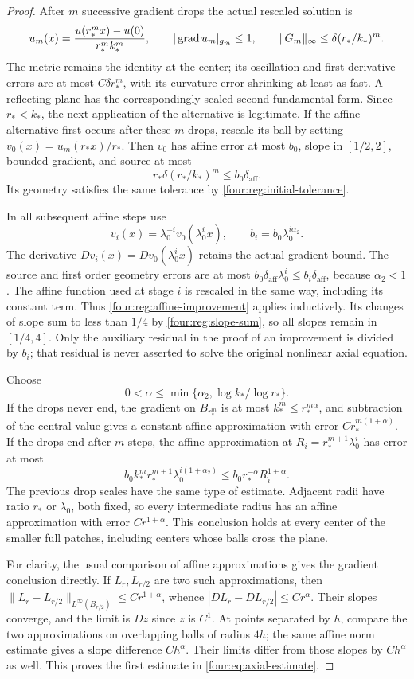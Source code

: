 \begin{proof}
After $m$ successive gradient drops the actual rescaled solution is
\[
 u_m(x)=\frac{u(r_*^m x)-u(0)}{r_*^m k_*^m},\qquad
 |\operatorname{grad} u_m|_{g_m}\le1,\qquad
 \|G_m\|_\infty\le\delta(r_*/k_*)^m.
\]
The metric remains the identity at the center; its oscillation and
first derivative errors are at most $C\delta r_*^m$, with its
curvature error shrinking at least as fast.  A reflecting plane
has the correspondingly scaled second fundamental form.  Since
$r_*<k_*$, the next application of the alternative is legitimate.
If the affine alternative first occurs after these $m$ drops,
rescale its ball by setting $v_0(x)=u_m(r_*x)/r_*$.
Then $v_0$ has affine error at most $b_0$, slope in $[1/2,2]$,
bounded gradient, and source at most
\[
 r_*\delta(r_*/k_*)^m\le b_0\delta_{\mathrm{aff}}.
\]
Its geometry satisfies the same tolerance by
\eqref{four:reg:initial-tolerance}.

In all subsequent affine steps use
\[
 v_i(x)=\lambda_0^{-i}v_0(\lambda_0^i x),\qquad
 b_i=b_0\lambda_0^{i\alpha_2}.
\]
The derivative $Dv_i(x)=Dv_0(\lambda_0^i x)$ retains the actual
gradient bound.  The source and first order geometry errors are
at most $b_0\delta_{\mathrm{aff}}\lambda_0^i\le b_i\delta_{\mathrm{aff}}$, because
$\alpha_2<1$.  The affine function used at stage $i$ is rescaled
in the same way, including its constant term.  Thus
\eqref{four:reg:affine-improvement} applies inductively.  Its changes
of slope sum to less than $1/4$ by \eqref{four:reg:slope-sum}, so all
slopes remain in $[1/4,4]$.  Only the auxiliary residual in the
proof of an improvement is divided by $b_i$; that residual is never
asserted to solve the original nonlinear axial equation.

Choose
\[
 0<\alpha\le\min\{\alpha_2,\log k_*/\log r_*\}.
\]
If the drops never end, the gradient on $B_{r_*^m}$ is at most
$k_*^m\le r_*^{m\alpha}$, and subtraction of the central value
gives a constant affine approximation with error $Cr_*^{m(1+\alpha)}$.
If the drops end after $m$ steps, the affine approximation at
$R_i=r_*^{m+1}\lambda_0^i$ has error at most
\[
 b_0 k_*^m r_*^{m+1}\lambda_0^{i(1+\alpha_2)}
       \le b_0r_*^{-\alpha}R_i^{1+\alpha}.
\]
The previous drop scales have the same type of estimate.  Adjacent
radii have ratio $r_*$ or $\lambda_0$, both fixed, so every
intermediate radius has an affine approximation with error
$Cr^{1+\alpha}$.  This conclusion holds at every center of the
smaller full patches, including centers whose balls cross the plane.

For clarity, the usual comparison of affine approximations gives
the gradient conclusion directly.  If $L_r,L_{r/2}$ are two such
approximations, then
$\|L_r-L_{r/2}\|_{L^\infty(B_{r/2})}\le Cr^{1+\alpha}$, whence
$|DL_r-DL_{r/2}|\le Cr^\alpha$.  Their slopes converge, and
the limit is $Dz$ since $z$ is $C^1$.  At points separated by $h$,
compare the two approximations on overlapping balls of radius $4h$;
the same affine norm estimate gives a slope difference $Ch^\alpha$.
Their limits differ from those slopes by $Ch^\alpha$ as well.
This proves the first estimate in \eqref{four:eq:axial-estimate}.


\end{proof}

